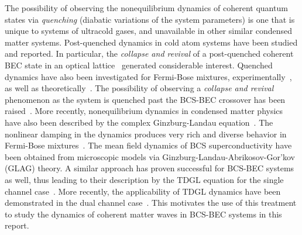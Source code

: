 \documentclass[a4paper,10pt]{article}
\begin{document}
The possibility of observing the nonequilibrium dynamics of coherent quantum states via \textit{quenching} (diabatic variations of the system parameters) is one that is unique to systems of ultracold gases, and unavailable in other similar condensed matter systems. Post-quenched dynamics in cold atom systems have been studied and reported. In particular, the \textit{collapse and revival} of a post-quenched coherent BEC state in an optical lattice~\cite{greiner:colrev} generated considerable interest. Quenched dynamics have also been investigated for Fermi-Bose mixtures, experimentally~\cite{olsen:rabifermi}, as well as theoretically~\cite{andreev:noneqmbcsbec,barankov:bcsbecbloch,uys:hyperbolicbcsbecdyn,jackpu:bcsbecdyn,yuzbashyan,yuzbashyan2}. The possibility of observing a \textit{collapse and revival} phenomenon as the system is quenched past the BCS-BEC crossover has been raised~\cite{huang:becbcs2}. More recently, nonequilibrium dynamics in condensed matter physics have also been described by the complex Ginzburg-Landau equation~\cite{ginzburglandau:review}. The nonlinear damping in the dynamics produces very rich and diverse behavior in Fermi-Bose mixtures~\cite{machida:dynamics}. The mean field dynamics of BCS superconductivity have been obtained from microscopic models via Ginzburg-Landau-Abrikosov-Gor'kov (GLAG) theory. A similar approach has proven successful for BCS-BEC systems as well, thus leading to their description by the TDGL equation for the single channel case~\cite{randeria:bcsbec3}. More recently, the applicability of TDGL dynamics have been demonstrated in the dual channel case~\cite{machida:dynamics}. This motivates the  use of this treatment to study the dynamics of coherent matter waves in BCS-BEC systems in this report.
\end{document}
